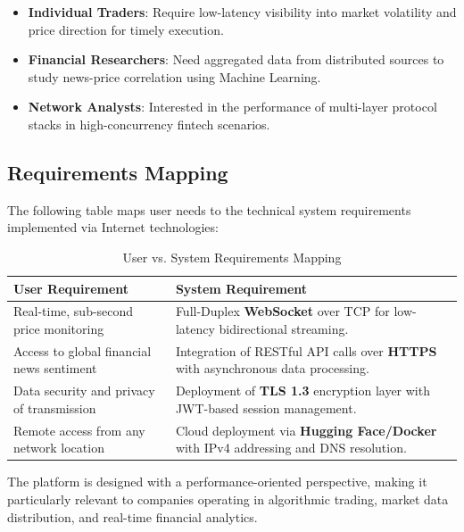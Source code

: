 \begin{itemize}
    \item \textbf{Individual Traders}: Require low-latency visibility into market volatility and price direction for timely execution.
    \item \textbf{Financial Researchers}: Need aggregated data from distributed sources to study news-price correlation using Machine Learning.
    \item \textbf{Network Analysts}: Interested in the performance of multi-layer protocol stacks in high-concurrency fintech scenarios.
\end{itemize}

\subsection{Requirements Mapping}

The following table maps user needs to the technical system requirements implemented via Internet technologies:

\begin{table}[H]
\centering
\small
\begin{tabular}{|p{}|p{}|}
\hline
\textbf{User Requirement} & \textbf{System Requirement} \\ \hline
Real-time, sub-second price monitoring & Full-Duplex \textbf{WebSocket} over TCP for low-latency bidirectional streaming. \\ \hline
Access to global financial news sentiment & Integration of RESTful API calls over \textbf{HTTPS} with asynchronous data processing. \\ \hline
Data security and privacy of transmission & Deployment of \textbf{TLS 1.3} encryption layer with JWT-based session management. \\ \hline
Remote access from any network location & Cloud deployment via \textbf{Hugging Face/Docker} with IPv4 addressing and DNS resolution. \\ \hline
\end{tabular}
\caption{User vs. System Requirements Mapping}
\label{tab:requirements_mapping}
\end{table}

The platform is designed with a performance-oriented perspective, making it particularly relevant to companies operating in algorithmic trading, market data distribution, and real-time financial analytics.

